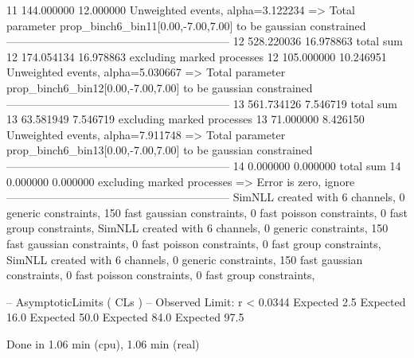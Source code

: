 11         144.000000      12.000000       Unweighted events, alpha=3.122234
  => Total parameter prop_binch6_bin11[0.00,-7.00,7.00] to be gaussian constrained
------------------------------------------------------------
12         528.220036      16.978863       total sum                     
12         174.054134      16.978863       excluding marked processes    
12         105.000000      10.246951       Unweighted events, alpha=5.030667
  => Total parameter prop_binch6_bin12[0.00,-7.00,7.00] to be gaussian constrained
------------------------------------------------------------
13         561.734126      7.546719        total sum                     
13         63.581949       7.546719        excluding marked processes    
13         71.000000       8.426150        Unweighted events, alpha=7.911748
  => Total parameter prop_binch6_bin13[0.00,-7.00,7.00] to be gaussian constrained
------------------------------------------------------------
14         0.000000        0.000000        total sum                     
14         0.000000        0.000000        excluding marked processes    
  => Error is zero, ignore      
------------------------------------------------------------
SimNLL created with 6 channels, 0 generic constraints, 150 fast gaussian constraints, 0 fast poisson constraints, 0 fast group constraints, 
SimNLL created with 6 channels, 0 generic constraints, 150 fast gaussian constraints, 0 fast poisson constraints, 0 fast group constraints, 
SimNLL created with 6 channels, 0 generic constraints, 150 fast gaussian constraints, 0 fast poisson constraints, 0 fast group constraints, 

 -- AsymptoticLimits ( CLs ) --
Observed Limit: r < 0.0344
Expected  2.5%
Expected 16.0%
Expected 50.0%
Expected 84.0%
Expected 97.5%

Done in 1.06 min (cpu), 1.06 min (real)
